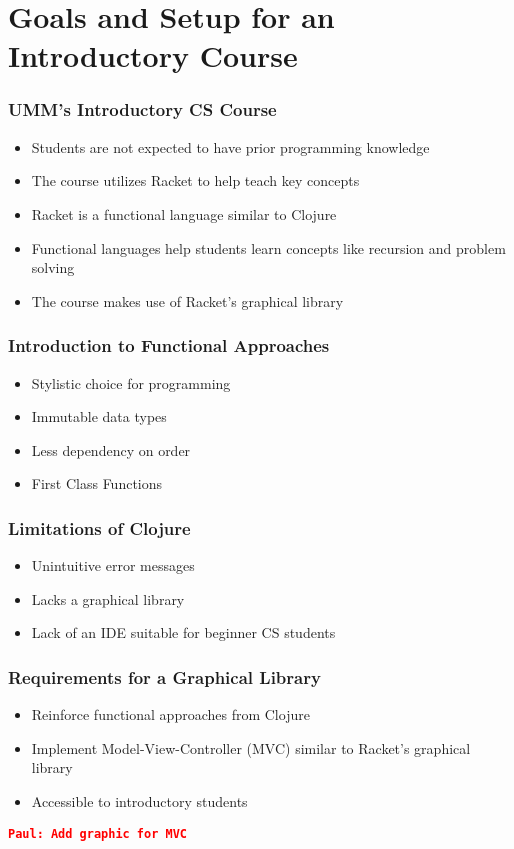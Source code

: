 \documentclass{beamer}
\newcommand{\comment}[1]{{\bf \tt  {#1}}}
\newcommand{\pscomment}[1]{\textcolor{red}{\comment{Paul: {#1}}}}
\begin{document}
\section{Goals and Setup for an Introductory Course}

\begin{frame}
\frametitle{UMM's Introductory CS Course}
\begin{itemize}
\item Students are not expected to have prior programming knowledge
\item The course utilizes Racket to help teach key concepts
\item Racket is a functional language similar to Clojure
\item Functional languages help students learn concepts like recursion and problem solving
\item The course makes use of Racket's graphical library 
\end{itemize}
\end{frame}

\begin{frame}
\frametitle{Introduction to Functional Approaches}
\begin{itemize}
\item Stylistic choice for programming
\item Immutable data types
\item Less dependency on order
\item First Class Functions
\end{itemize}
\end{frame}

\begin{frame}
\frametitle{Limitations of Clojure}
\begin{itemize}
\item Unintuitive error messages
\item Lacks a graphical library
\item Lack of an IDE suitable for beginner CS students
\end{itemize}
\end{frame}

\begin{frame}
\frametitle{Requirements for a Graphical Library}
\begin{itemize}
\item Reinforce functional approaches from Clojure
\item Implement Model-View-Controller (MVC) similar to Racket's graphical library
\item Accessible to introductory students
\end{itemize}
\pscomment{Add graphic for MVC}
\end{frame}
\end{document}
